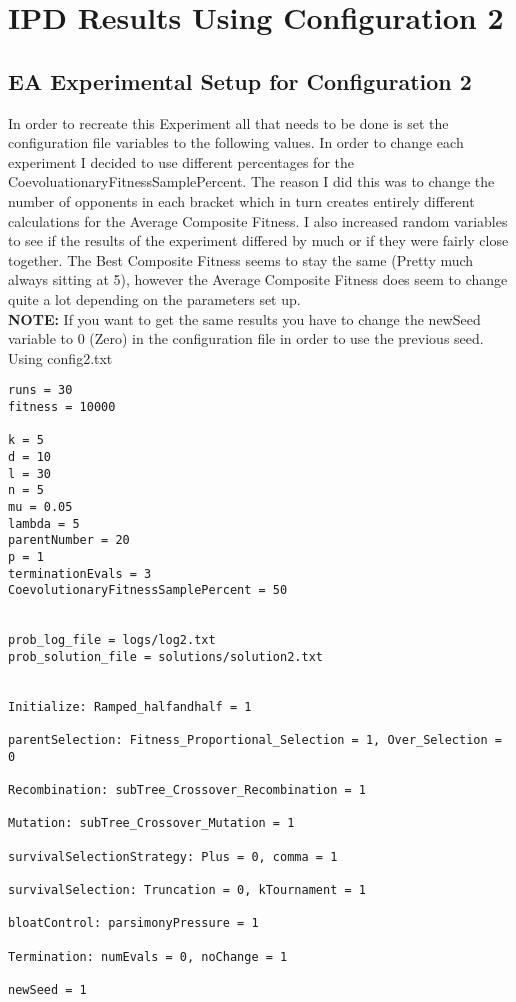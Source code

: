 \documentclass[•]{article}
\begin{document}
\pagebreak
\section{IPD Results Using Configuration 2}

\subsection{EA Experimental Setup for Configuration 2}
\indent \indent In order to recreate this Experiment all that needs to be done is set the configuration file variables to the following values.  In order to change each experiment I decided to use different percentages for the CoevoluationaryFitnessSamplePercent.  The reason I did this was to change the number of opponents in each bracket which in turn creates entirely different calculations for the Average Composite Fitness.  I also increased random variables to see if the results of the experiment differed by much or if they were fairly close together.  The Best Composite Fitness seems to stay the same (Pretty much always sitting at 5), however the Average Composite Fitness does seem to change quite a lot depending on the parameters set up.\\
\indent \textbf{NOTE:} If you want to get the same results you have to change the newSeed variable to 0 (Zero) in the configuration file in order to use the previous seed.\\

Using config2.txt 
\begin{lstlisting}
runs = 30
fitness = 10000

k = 5
d = 10
l = 30
n = 5
mu = 0.05
lambda = 5
parentNumber = 20
p = 1
terminationEvals = 3
CoevolutionaryFitnessSamplePercent = 50


prob_log_file = logs/log2.txt
prob_solution_file = solutions/solution2.txt


Initialize: Ramped_halfandhalf = 1

parentSelection: Fitness_Proportional_Selection = 1, Over_Selection = 0

Recombination: subTree_Crossover_Recombination = 1

Mutation: subTree_Crossover_Mutation = 1

survivalSelectionStrategy: Plus = 0, comma = 1

survivalSelection: Truncation = 0, kTournament = 1

bloatControl: parsimonyPressure = 1

Termination: numEvals = 0, noChange = 1

newSeed = 1
\end{lstlisting}
\end{document}
